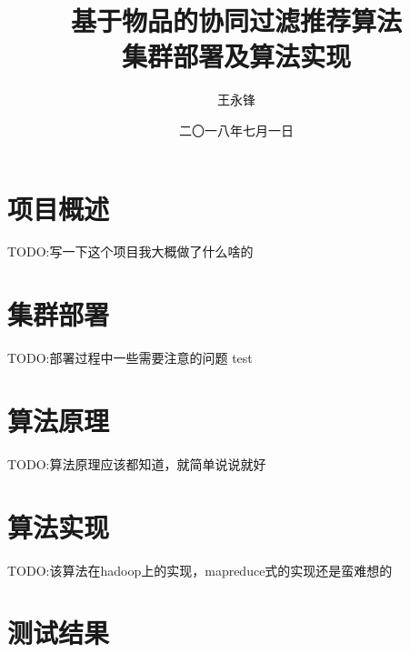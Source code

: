 \documentclass[forprint]{myreport}
\begin{document}
\title{ 基于物品的协同过滤推荐算法 \\ 集群部署及算法实现}
\author{王永锋}                            %
\date{二〇一八年七月一日}                %
\maketitle
\frontmatter
\tableofcontents
\mainmatter 

\chapter{项目概述}

TODO:写一下这个项目我大概做了什么啥的

\chapter{集群部署}

TODO:部署过程中一些需要注意的问题
test

\chapter{算法原理}


TODO:算法原理应该都知道，就简单说说就好


\chapter{算法实现}

TODO:该算法在hadoop上的实现，mapreduce式的实现还是蛮难想的

\chapter{测试结果}
\end{document}
